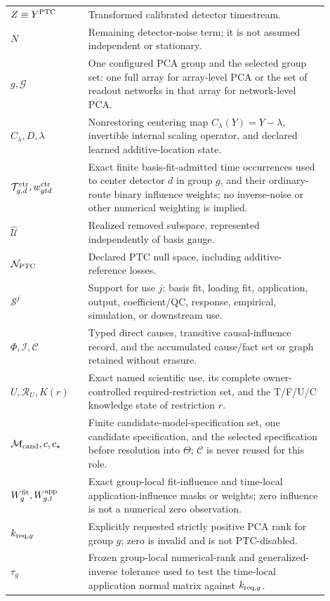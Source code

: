 \begin{longtable}{>{\raggedright\arraybackslash}p{0.22\linewidth}
                  >{\raggedright\arraybackslash}p{0.68\linewidth}}
$Z\equiv Y^{\rm PTC}$ & Transformed calibrated detector timestream. \\
$N$ & Remaining detector-noise term; it is not assumed independent or stationary. \\
$g,\mathcal G$ & One configured PCA group and the selected group set: one full array for array-level PCA or the set of readout networks in that array for network-level PCA. \\
$C_{\lambda},D,\lambda$ & Nonrestoring centering map $C_{\lambda}(Y)=Y-\lambda$, invertible internal scaling operator, and declared learned additive-location state. \\
$\mathcal T^{\rm ctr}_{g,d},w^{\rm ctr}_{gtd}$ & Exact finite basis-fit-admitted time occurrences used to center detector $d$ in group $g$, and their ordinary-route binary influence weights; no inverse-noise or other numerical weighting is implied. \\
$\widehat{\mathcal U}$ & Realized removed subspace, represented independently of basis gauge. \\
$\mathcal N_{\rm PTC}$ & Declared PTC null space, including additive-reference losses. \\
$\mathcal S^{j}$ & Support for use $j$: basis fit, loading fit, application, output, coefficient/QC, response, empirical, simulation, or downstream use. \\
$\Phi,\mathcal I,\mathcal C$ & Typed direct causes, transitive causal-influence record, and the accumulated cause/fact set or graph retained without erasure. \\
$U,\mathcal R_U,K(r)$ & Exact named scientific use, its complete owner-controlled required-restriction set, and the T/F/U/C knowledge state of restriction $r$. \\
$\mathcal M_{\rm cand},c,c_\star$ & Finite candidate-model-specification set, one candidate specification, and the selected specification before resolution into $\Theta$; $\mathcal C$ is never reused for this role. \\
$W^{\rm fit}_{g},W^{\rm app}_{g,t}$ & Exact group-local fit-influence and time-local application-influence masks or weights; zero influence is not a numerical zero observation. \\
$k_{{\rm req},g}$ & Explicitly requested strictly positive PCA rank for group $g$; zero is invalid and is not PTC-disabled. \\
$\tau_g$ & Frozen group-local numerical-rank and generalized-inverse tolerance used to test the time-local application normal matrix against $k_{{\rm req},g}$. \\

\end{longtable}
